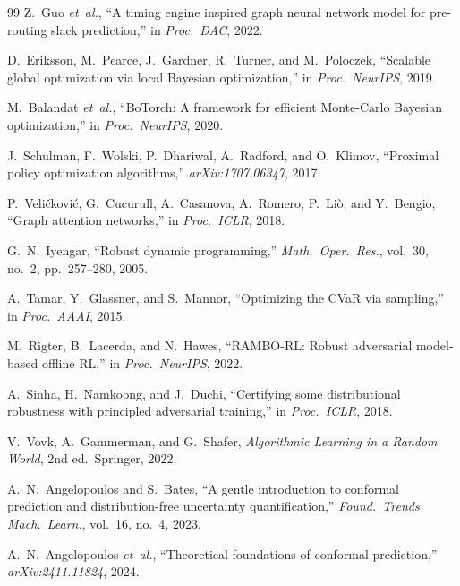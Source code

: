 \documentclass[journal,onecolumn=false]{IEEEtran}
\begin{document}
\begin{thebibliography}{99}
Z.~Guo \emph{et~al.}, ``A timing engine inspired graph neural network model for pre-routing slack prediction,'' in \emph{Proc.\ DAC}, 2022.

D.~Eriksson, M.~Pearce, J.~Gardner, R.~Turner, and M.~Poloczek, ``Scalable global optimization via local Bayesian optimization,'' in \emph{Proc.\ NeurIPS}, 2019.

M.~Balandat \emph{et~al.}, ``BoTorch: A framework for efficient Monte-Carlo Bayesian optimization,'' in \emph{Proc.\ NeurIPS}, 2020.

J.~Schulman, F.~Wolski, P.~Dhariwal, A.~Radford, and O.~Klimov, ``Proximal policy optimization algorithms,'' \emph{arXiv:1707.06347}, 2017.

P.~Veli\v{c}kovi\'c, G.~Cucurull, A.~Casanova, A.~Romero, P.~Li\`o, and Y.~Bengio, ``Graph attention networks,'' in \emph{Proc.\ ICLR}, 2018.

G.~N.~Iyengar, ``Robust dynamic programming,'' \emph{Math.\ Oper.\ Res.}, vol.~30, no.~2, pp.~257--280, 2005.

A.~Tamar, Y.~Glassner, and S.~Mannor, ``Optimizing the CVaR via sampling,'' in \emph{Proc.\ AAAI}, 2015.

M.~Rigter, B.~Lacerda, and N.~Hawes, ``RAMBO-RL: Robust adversarial model-based offline RL,'' in \emph{Proc.\ NeurIPS}, 2022.

A.~Sinha, H.~Namkoong, and J.~Duchi, ``Certifying some distributional robustness with principled adversarial training,'' in \emph{Proc.\ ICLR}, 2018.

V.~Vovk, A.~Gammerman, and G.~Shafer, \emph{Algorithmic Learning in a Random World}, 2nd ed.\ Springer, 2022.

A.~N.~Angelopoulos and S.~Bates, ``A gentle introduction to conformal prediction and distribution-free uncertainty quantification,'' \emph{Found.\ Trends Mach.\ Learn.}, vol.~16, no.~4, 2023.

A.~N.~Angelopoulos \emph{et~al.}, ``Theoretical foundations of conformal prediction,'' \emph{arXiv:2411.11824}, 2024.

\end{thebibliography}
\end{document}
